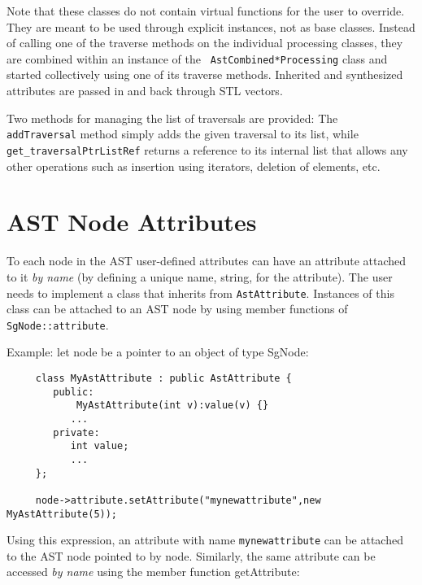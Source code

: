Note that these classes do not contain virtual functions for the user to
override. They are meant to be used through explicit instances, not as base
classes. Instead of calling one of the traverse methods on the individual
processing classes, they are combined within an instance of the {\tt
AstCombined*Processing} class and started collectively using one of its
traverse methods. Inherited and synthesized attributes are passed in and back
through STL vectors.

Two methods for managing the list of traversals are provided: The {\tt
addTraversal} method simply adds the given traversal to its list, while {\tt
get\_traversalPtrListRef} returns a reference to its internal list that allows
any other operations such as insertion using iterators, deletion of elements,
etc.


\section{AST Node Attributes}

To each node in the AST user-defined attributes can have an attribute attached to 
it {\em by name} (by defining a unique name, string, for the attribute). The
user needs to implement a class that inherits from {\tt AstAttribute}. Instances of this
class can be attached to an AST node by using member functions of {\tt SgNode::attribute}.

Example: let node be a pointer to an object of type SgNode:
{\indent
{\mySmallFontSize
\begin{verbatim}
     class MyAstAttribute : public AstAttribute {
        public:
	        MyAstAttribute(int v):value(v) {}
           ...
        private:
           int value;
           ...
     };

     node->attribute.setAttribute("mynewattribute",new MyAstAttribute(5));
\end{verbatim}
}}
Using this expression, an attribute with name {\tt mynewattribute} can
be attached to the AST node pointed to by node. Similarly, the same attribute can be
accessed {\em by name} using the member function getAttribute:

